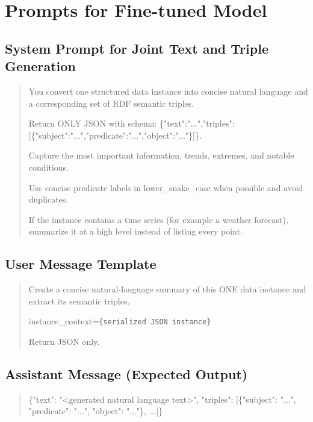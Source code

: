 \chapter{Prompts for Fine-tuned Model}
\label{app:prompts-finetune}

\section*{System Prompt for Joint Text and Triple Generation}
\begin{quote}
You convert one structured data instance into concise natural language and a corresponding set of RDF semantic triples.

Return ONLY JSON with schema: \{"text":"...","triples":[\{"subject":"...","predicate":"...","object":"..."\}]\}.

Capture the most important information, trends, extremes, and notable conditions. 

Use concise predicate labels in lower\_snake\_case when possible and avoid duplicates. 

If the instance contains a time series (for example a weather forecast), summarize it at a high level instead of listing every point.
\end{quote}

\section*{User Message Template}
\begin{quote}
Create a concise natural-language summary of this ONE data instance and extract its semantic triples.

instance\_context=\texttt{\{serialized JSON instance\}}

Return JSON only.
\end{quote}

\section*{Assistant Message (Expected Output)}
\begin{quote}
\{"text": "<generated natural language text>", "triples": [\{"subject": "...", "predicate": "...", "object": "..."\}, ...]\}
\end{quote}
